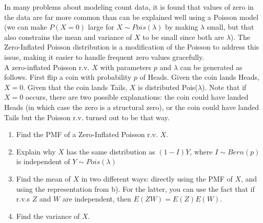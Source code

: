 \documentclass[11pt]{article}
\begin{document}
\begin{exercise}
In many problems about modeling count data, it is found that values of zero in the data are far more common than can be explained well using a Poisson model (we can make $P(X=0)$ large for $X \sim Pois(\lambda)$ by making $\lambda$ small, but that also constrains the mean and variance of $X$ to be small since both are $\lambda$). The Zero-Inflated Poisson distribution is a modification of the Poisson to address this issue, making it easier to handle frequent zero values gracefully.\\
A zero-inflated Poisson r.v. $X$ with parameters $p$ and $\lambda$ can be generated as follows. First flip a coin with probability $p$ of Heads. Given the coin lands Heads, $X=0$. Given that the coin lands Tails, $X$ is distributed Pois($\lambda$). Note that if $X=0$ occurs, there are two possible explanations: the coin could have landed Heads (in which case the zero is a structural zero), or the coin could have landed Tails but the Poisson r.v. turned out to be that way.\\
\begin{enumerate}
\item Find the PMF of a Zero-Inflated Poisson r.v. $X$.

\item Explain why $X$ has the same distribution as $(1-I)Y$, where $I \sim Bern(p)$ is independent of $Y \sim Pois(\lambda)$

\item Find the mean of $X$ in two different ways: directly using the PMF of $X$, and using the representation from b). For the latter, you can use the fact that if r.v.s $Z$ and $W$ are independent, then $E(ZW) = E(Z)E(W)$.

\item Find the variance of $X$.

\end{enumerate}
\end{exercise}
\end{document}

